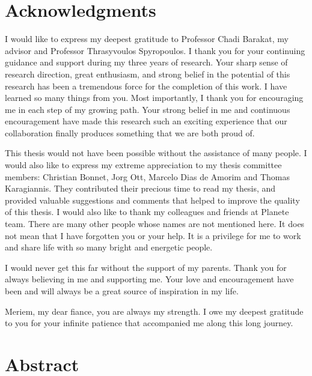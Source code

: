 \documentclass[a4paper,11pt,twoside]{ThesisStyle}
\begin{document}


\dominitoc


\cleardoublepage

\section*{Acknowledgments}

I would like to express my deepest gratitude to Professor Chadi Barakat, my advisor and Professor Thrasyvoulos Spyropoulos. I thank you for your continuing guidance and support during my three years of research. Your sharp sense of research direction, great enthusiasm, and strong belief in the potential of this research has been a tremendous force for the completion of this work. I have learned so many things from you. Most importantly, I thank you for encouraging me in each step of my growing path. Your strong belief in me and continuous encouragement have made this research such an exciting experience that our collaboration finally produces something that we are both proud of.

This thesis would not have been possible without the assistance of many people. I would also like to express my extreme appreciation to my thesis committee members: Christian Bonnet, Jorg Ott, Marcelo Dias de Amorim and Thomas Karagiannis. They contributed their precious time to read my thesis, and provided valuable suggestions and comments that helped to improve the quality of this thesis. I would also like to thank my colleagues and friends at Planete team. There are many other people whose names are not mentioned here. It does not mean that I have forgotten you or your help. It is a privilege for me to work and share life with so many bright and energetic people. 

I would never get this far without the support of my parents. Thank you for always believing in me and supporting me. Your love and encouragement have been and will always be a great source of inspiration in my life.  

Meriem, my dear fiance, you are always my strength. I owe my deepest gratitude to you for your infinite patience that accompanied me along this long journey.

\cleardoublepage

\section*{Abstract}
\end{document}
